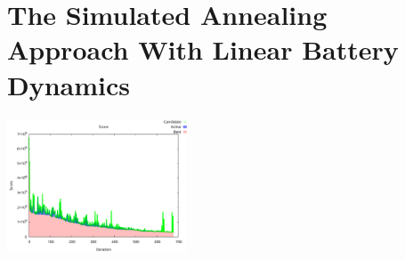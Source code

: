 \documentclass[aspectratio=169,dvipsnames]{beamer}
\begin{document}
\section{The Simulated Annealing Approach With Linear Battery Dynamics}
\label{sec:org02de3ba}
\begin{frame}[label={sec:org887c4f3}]{}
\begin{block}{}
\begin{center}
\includegraphics[width=0.4\textwidth]{./img/score-convergence.pdf}
\end{center}
\end{block}

\begin{exampleblock}{}
\tableofcontents[currentsection]
\end{exampleblock}
\end{frame}
\end{document}
